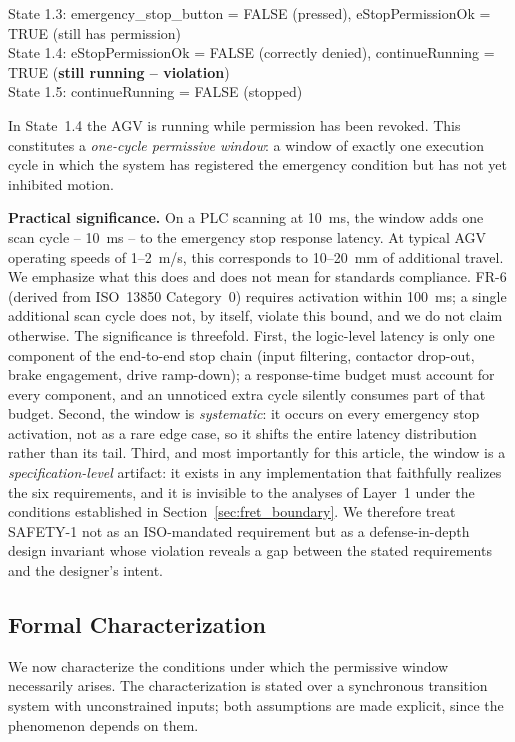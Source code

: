 \documentclass{ieeeaccess}
\theoremstyle{definition}
\begin{document}
\noindent
State 1.3: emergency\_stop\_button = FALSE (pressed), eStopPermissionOk = TRUE (still has permission) \\
State 1.4: eStopPermissionOk = FALSE (correctly denied), continueRunning = TRUE (\textbf{still running -- violation}) \\
State 1.5: continueRunning = FALSE (stopped)

\noindent
In State~1.4 the AGV is running while permission has been revoked. This constitutes a \emph{one-cycle permissive window}: a window of exactly one execution cycle in which the system has registered the emergency condition but has not yet inhibited motion.

\smallskip\noindent\textbf{Practical significance.} On a PLC scanning at 10~ms, the window adds one scan cycle -- 10~ms -- to the emergency stop response latency. At typical AGV operating speeds of 1--2~m/s, this corresponds to 10--20~mm of additional travel. We emphasize what this does and does not mean for standards compliance. FR-6 (derived from ISO~13850 Category~0) requires activation within 100~ms; a single additional scan cycle does not, by itself, violate this bound, and we do not claim otherwise. The significance is threefold. First, the logic-level latency is only one component of the end-to-end stop chain (input filtering, contactor drop-out, brake engagement, drive ramp-down); a response-time budget must account for every component, and an unnoticed extra cycle silently consumes part of that budget. Second, the window is \emph{systematic}: it occurs on every emergency stop activation, not as a rare edge case, so it shifts the entire latency distribution rather than its tail. Third, and most importantly for this article, the window is a \emph{specification-level} artifact: it exists in any implementation that faithfully realizes the six requirements, and it is invisible to the analyses of Layer~1 under the conditions established in Section~\ref{sec:fret_boundary}. We therefore treat SAFETY-1 not as an ISO-mandated requirement but as a defense-in-depth design invariant whose violation reveals a gap between the stated requirements and the designer's intent.

\subsection{Formal Characterization}
\label{sec:formal}
We now characterize the conditions under which the permissive window necessarily arises. The characterization is stated over a synchronous transition system with unconstrained inputs; both assumptions are made explicit, since the phenomenon depends on them.
\end{document}

